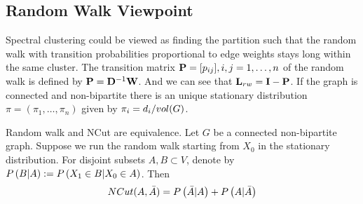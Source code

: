 \subsection{Random Walk Viewpoint}

Spectral clustering could be viewed as finding the partition such that the random walk with transition probabilities proportional to edge weights stays long within the same cluster. The transition matrix $\mat{P}=[p_{ij}],i,j=1,\dotsc,n$ of the random walk is defined by $\mat{P}=\mat{D}\inv\mat{W}$. And we can see that $\mat{L}_{rw}=\mat{I}-\mat{P}$. If the graph is connected and non-bipartite there is an unique stationary distribution $\pi=(\pi_1,\dotsc,\pi_n)$ given by $\pi_i=\pfrac{d_i}{vol(G)}$.

Random walk and NCut are equivalence. Let $G$ be a connected non-bipartite graph. Suppose we run the random walk starting from $X_0$ in the stationary distribution. For disjoint subsets $A,B\subset V$, denote by $\P{B|A}:=\P{X_1\in B|X_0\in A}$. Then
\begin{align*}
	NCut(A,\bar{A})=\P{\bar{A}|A}+\P{A|\bar{A}}
\end{align*}
